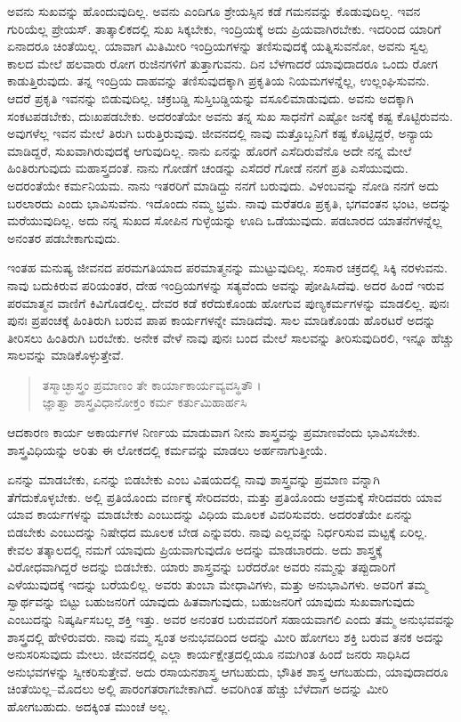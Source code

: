 ಅವನು ಸುಖವನ್ನು ಹೊಂದುವುದಿಲ್ಲ. ಅವನು ಎಂದಿಗೂ ಶ್ರೇಯಸ್ಸಿನ ಕಡೆ ಗಮನವನ್ನು ಕೊಡುವುದಿಲ್ಲ. ಇವನ ಗುರಿಯೆಲ್ಲ ಪ್ರೇಯಸ್. ತಾತ್ಕಾಲಿಕದಲ್ಲಿ ಸುಖ ಸಿಕ್ಕಬೇಕು, ಇಂದ್ರಿಯಕ್ಕೆ ಅದು ಪ್ರಿಯವಾಗಿರಬೇಕು. ಇದರಿಂದ ಯಾರಿಗೆ ಏನಾದರೂ ಚಿಂತೆಯಿಲ್ಲ. ಯಾವಾಗ ಮಿತಿಮೀರಿ ಇಂದ್ರಿಯಗಳನ್ನು ತಣಿಸುವುದಕ್ಕೆ ಯತ್ನಿಸುವನೋ, ಅವನು ಸ್ವಲ್ಪ ಕಾಲದ ಮೇಲೆ ಹಲವಾರು ರೋಗ ರುಜಿನಗಳಿಗೆ ತುತ್ತಾಗುವನು. ದಿನ ಬೆಳಗಾದರೆ ಯಾವುದಾದರೂ ಒಂದು ರೋಗ ಕಾಡುತ್ತಿರುವುದು. ತನ್ನ ಇಂದ್ರಿಯ ದಾಹವನ್ನು ತಣಿಸುವುದಕ್ಕಾಗಿ ಪ್ರಕೃತಿಯ ನಿಯಮಗಳನ್ನೆಲ್ಲ, ಉಲ್ಲಂಘಿಸುವನು. ಆದರೆ ಪ್ರಕೃತಿ ಇವನನ್ನು ಬಿಡುವುದಿಲ್ಲ. ಚಕ್ರಬಡ್ಡಿ ಸುಸ್ತಿಬಡ್ಡಿಯನ್ನು ವಸೂಲಿಮಾಡುವುದು. ಅವನು ಅದಕ್ಕಾಗಿ ಸಂಕಟಪಡಬೇಕು, ದುಃಖಪಡಬೇಕು. ಅದರಂತೆಯೇ ಅವನು ತನ್ನ ಸುಖ ಸಾಧನೆಗೆ ಎಷ್ಟೋ ಜನಕ್ಕೆ ಕಷ್ಟ ಕೊಟ್ಟಿರುವನು. ಅವುಗಳೆಲ್ಲ ಇವನ ಮೇಲೆ ತಿರುಗಿ ಬರುತ್ತಿರುವುವು. ಜೀವನದಲ್ಲಿ ನಾವು ಮತ್ತೊಬ್ಬನಿಗೆ ಕಷ್ಟ ಕೊಟ್ಟಿದ್ದರೆ, ಅನ್ಯಾಯ ಮಾಡಿದ್ದರೆ, ಸುಖವಾಗಿರುವುದಕ್ಕೆ ಆಗುವುದಿಲ್ಲ. ನಾನು ಏನನ್ನು ಹೊರಗೆ ಎಸೆದಿರುವೆನೊ ಅದೇ ನನ್ನ ಮೇಲೆ ಹಿಂತಿರುಗುವುದು ಮಹಾಸ್ತ್ರದಂತೆ. ನಾನು ಗೋಡೆಗೆ ಚಂಡನ್ನು ಎಸೆದರೆ ಗೋಡೆ ನನಗೆ ಪ್ರತಿ ಎಸೆಯುವುದು. ಅದರಂತೆಯೇ ಕರ್ಮನಿಯಮ. ನಾನು ಇತರರಿಗೆ ಮಾಡಿದ್ದು ನನಗೆ ಬರುವುದು. ವಿಳಂಬವನ್ನು ನೋಡಿ ನನಗೆ ಅದು ಬರಲಾರದು ಎಂದು ಭಾವಿಸುವೆನು. ಇದೊಂದು ನಮ್ಮ ಭ್ರಮೆ. ನಾವು ಮರೆತರೂ ಪ್ರಕೃತಿ, ಭಗವಂತನ ಭಂಟ, ಅದನ್ನು ಮರೆಯುವುದಿಲ್ಲ. ಅದು ನನ್ನ ಸುಖದ ಸೋಪಿನ ಗುಳ್ಳೆಯನ್ನು ಊದಿ ಒಡೆಯುವುದು. ಪಡಬಾರದ ಯಾತನೆಗಳನ್ನೆಲ್ಲ ಅನಂತರ ಪಡಬೇಕಾಗುವುದು.

ಇಂತಹ ಮನುಷ್ಯ ಜೀವನದ ಪರಮಗತಿಯಾದ ಪರಮಾತ್ಮನನ್ನು ಮುಟ್ಟುವುದಿಲ್ಲ. ಸಂಸಾರ ಚಕ್ರದಲ್ಲಿ ಸಿಕ್ಕಿ ನರಳುವನು. ನಾವು ಬದುಕಿರುವ ಪರಿಯಂತರ, ದೇಹ ಇಂದ್ರಿಯಗಳನ್ನು ಸತ್ಯವೆಂದು ಅವನ್ನು ಪೋಷಿಸಿದೆವು. ಅದರ ಹಿಂದೆ ಇರುವ ಪರಮಾತ್ಮನ ವಾಣಿಗೆ ಕಿವಿಗೊಡಲಿಲ್ಲ. ದೇವರ ಕಡೆ ಕರೆದುಕೊಂಡು ಹೋಗುವ ಪುಣ್ಯಕರ್ಮಗಳನ್ನು ಮಾಡಲಿಲ್ಲ. ಪುನಃ ಪುನಃ ಪ್ರಪಂಚಕ್ಕೆ ಹಿಂತಿರುಗಿ ಬರುವ ಪಾಪ ಕಾರ್ಯಗಳನ್ನೇ ಮಾಡಿದೆವು. ಸಾಲ ಮಾಡಿಕೊಂಡು ಹೊರಟರೆ ಅದನ್ನು ತೀರಿಸಲು ಹಿಂತಿರುಗಿ ಬರಬೇಕು. ಅನೇಕ ವೇಳೆ ನಾವು ಪುನಃ ಬಂದ ಮೇಲೆ ಸಾಲವನ್ನು ತೀರಿಸುವುದಿರಲಿ, ಇನ್ನೂ ಹೆಚ್ಚು ಸಾಲವನ್ನು ಮಾಡಿಕೊಳ್ಳುತ್ತೇವೆ.

\begin{verse}
ತಸ್ಮಾಚ್ಛಾಸ್ತ್ರಂ ಪ್ರಮಾಣಂ ತೇ ಕಾರ್ಯಾಕಾರ್ಯವ್ಯವಸ್ಥಿತೌ ।\\ಜ್ಞಾತ್ವಾ ಶಾಸ್ತ್ರವಿಧಾನೋಕ್ತಂ ಕರ್ಮ ಕರ್ತುಮಿಹಾರ್ಹಸಿ 
\end{verse}

{\small ಆದಕಾರಣ ಕಾರ್ಯ ಅಕಾರ್ಯಗಳ ನಿರ್ಣಯ ಮಾಡುವಾಗ ನೀನು ಶಾಸ್ತ್ರವನ್ನು ಪ್ರಮಾಣವೆಂದು ಭಾವಿಸಬೇಕು. ಶಾಸ್ತ್ರವಿಧಿಯನ್ನು ಅರಿತು ಈ ಲೋಕದಲ್ಲಿ ಕರ್ಮವನ್ನು ಮಾಡಲು ಅರ್ಹನಾಗುತ್ತೀಯೆ.}

ಏನನ್ನು ಮಾಡಬೇಕು, ಏನನ್ನು ಬಿಡಬೇಕು ಎಂಬ ವಿಷಯದಲ್ಲಿ ನಾವು ಶಾಸ್ತ್ರವನ್ನು ಪ್ರಮಾಣ ವನ್ನಾಗಿ ತೆಗೆದುಕೊಳ್ಳಬೇಕು. ಅಲ್ಲಿ ಪ್ರತಿಯೊಂದು ವರ್ಣಕ್ಕೆ ಸೇರಿದವರು, ಮತ್ತು ಪ್ರತಿಯೊಂದು ಆಶ್ರಮಕ್ಕೆ ಸೇರಿದವರು ಯಾವ ಯಾವ ಕಾರ್ಯಗಳನ್ನು ಮಾಡಬೇಕು ಎಂಬುದನ್ನು ವಿಧಿಯ ಮೂಲಕ ವಿವರಿಸುವರು. ಅದರಂತೆಯೇ ಏನನ್ನು ಬಿಡಬೇಕು ಎಂಬುದನ್ನು ನಿಷೇಧದ ಮೂಲಕ ಬೇಡ ಎನ್ನುವರು. ನಾವು ಎಲ್ಲವನ್ನು ನಿರ್ಧರಿಸುವ ಮಟ್ಟಕ್ಕೆ ಏರಿಲ್ಲ. ಕೇವಲ ತತ್ಕಾಲದಲ್ಲಿ ನಮಗೆ ಯಾವುದು ಪ್ರಿಯವಾಗುವುದೊ ಅದನ್ನು ಮಾಡಬಾರದು. ಅದು ಶಾಸ್ತ್ರಕ್ಕೆ ವಿರೋಧವಾಗಿದ್ದರೆ ಅದನ್ನು ಬಿಡಬೇಕು. ಯಾರು ಶಾಸ್ತ್ರವನ್ನು ಬರೆದರೋ ಅವರು ನಮ್ಮನ್ನು ತಪ್ಪುದಾರಿಗೆ ಎಳೆಯುವುದಕ್ಕೆ ಇದನ್ನು ಬರೆಯಲಿಲ್ಲ. ಅವರು ತುಂಬಾ ಮೇಧಾವಿಗಳು, ಮತ್ತು ಅನುಭಾವಿಗಳು. ಅವರಿಗೆ ತಮ್ಮ ಸ್ವಾರ್ಥವನ್ನು ಬಿಟ್ಟು ಬಹುಜನರಿಗೆ ಯಾವುದು ಹಿತವಾಗುವುದು, ಬಹುಜನರಿಗೆ ಯಾವುದು ಸುಖವಾಗುವುದು ಎಂಬುದನ್ನು ನಿಷ್ಕರ್ಷಿಸಬಲ್ಲ ಶಕ್ತಿ ಇತ್ತು. ಅವರ ಅನಂತರ ಬರುವವರಿಗೆ ಸಹಾಯವಾಗಲಿ ಎಂದು ತಮ್ಮ ಅನುಭವವನ್ನು ಶಾಸ್ತ್ರದಲ್ಲಿ ಹೇಳಿರುವರು. ನಾವು ನಮ್ಮ ಸ್ವಂತ ಅನುಭವದಿಂದ ಅದನ್ನು ಮೀರಿ ಹೋಗಲು ಶಕ್ತಿ ಬರುವ ತನಕ ಅದನ್ನು ಅನುಸರಿಸುವುದು ಮೇಲು. ಜೀವನದಲ್ಲಿ ಎಲ್ಲಾ ಕಾರ್ಯಕ್ಷೇತ್ರದಲ್ಲಿಯೂ ನಮಗಿಂತ ಹಿಂದೆ ಜನರು ಸಾಧಿಸಿದ ಅನುಭವಗಳನ್ನು ಸ್ವೀಕರಿಸುತ್ತೇವೆ. ಅದು ರಸಾಯನಶಾಸ್ತ್ರ ಆಗಬಹುದು, ಭೌತಿಕ ಶಾಸ್ತ್ರ ಆಗಬಹುದು, ಯಾವುದಾದರೂ ಚಿಂತೆಯಿಲ್ಲ–ಮೊದಲು ಅಲ್ಲಿ ಪಾರಂಗತರಾಗಬೇಕಾಗಿದೆ. ಅವರಿಗಿಂತ ಹೆಚ್ಚು ಬೆಳೆದಾಗ ಅದನ್ನು ಮೀರಿ ಹೋಗಬಹುದು. ಅದಕ್ಕಿಂತ ಮುಂಚೆ ಅಲ್ಲ.

